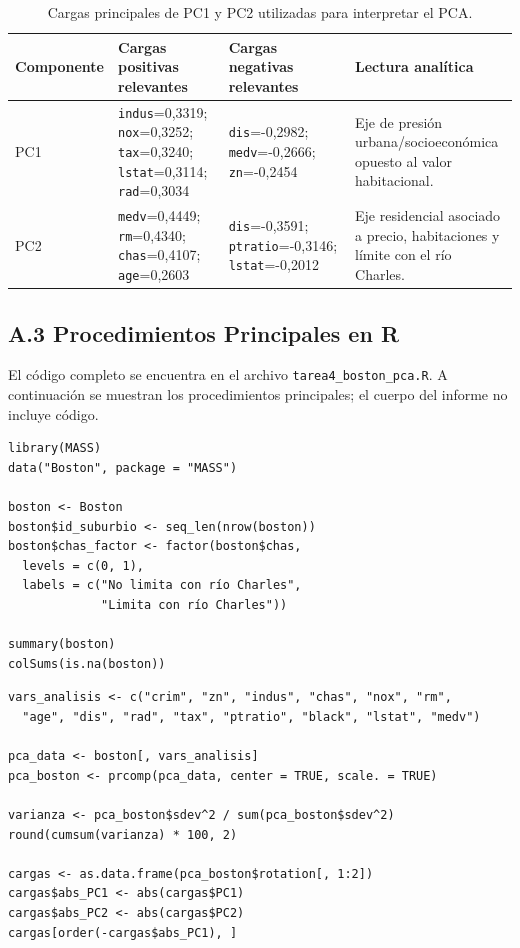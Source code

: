 \documentclass[10pt,a4paper]{article}
\begin{document}
\begin{table}[H]
  \centering
  \caption{Cargas principales de PC1 y PC2 utilizadas para interpretar el PCA.}
  \label{tab:pca_cargas}
  \footnotesize
  \begin{tabularx}{\textwidth}{l X X X}
    \toprule
    \textbf{Componente} & \textbf{Cargas positivas relevantes} & \textbf{Cargas negativas relevantes} & \textbf{Lectura analítica} \\
    \midrule
    PC1 & \texttt{indus}=0,3319; \texttt{nox}=0,3252; \texttt{tax}=0,3240; \texttt{lstat}=0,3114; \texttt{rad}=0,3034 & \texttt{dis}=-0,2982; \texttt{medv}=-0,2666; \texttt{zn}=-0,2454 & Eje de presión urbana/socioeconómica opuesto al valor habitacional. \\
    PC2 & \texttt{medv}=0,4449; \texttt{rm}=0,4340; \texttt{chas}=0,4107; \texttt{age}=0,2603 & \texttt{dis}=-0,3591; \texttt{ptratio}=-0,3146; \texttt{lstat}=-0,2012 & Eje residencial asociado a precio, habitaciones y límite con el río Charles. \\
    \bottomrule
  \end{tabularx}
\end{table}

\subsection*{A.3 Procedimientos Principales en R}

El código completo se encuentra en el archivo \texttt{tarea4\_boston\_pca.R}. A continuación se muestran los procedimientos principales; el cuerpo del informe no incluye código.

\begin{lstlisting}[caption={Carga de datos y revisión inicial.}]
library(MASS)
data("Boston", package = "MASS")

boston <- Boston
boston$id_suburbio <- seq_len(nrow(boston))
boston$chas_factor <- factor(boston$chas,
  levels = c(0, 1),
  labels = c("No limita con río Charles",
             "Limita con río Charles"))

summary(boston)
colSums(is.na(boston))
\end{lstlisting}

\begin{lstlisting}[caption={PCA sobre variables estandarizadas.}]
vars_analisis <- c("crim", "zn", "indus", "chas", "nox", "rm",
  "age", "dis", "rad", "tax", "ptratio", "black", "lstat", "medv")

pca_data <- boston[, vars_analisis]
pca_boston <- prcomp(pca_data, center = TRUE, scale. = TRUE)

varianza <- pca_boston$sdev^2 / sum(pca_boston$sdev^2)
round(cumsum(varianza) * 100, 2)

cargas <- as.data.frame(pca_boston$rotation[, 1:2])
cargas$abs_PC1 <- abs(cargas$PC1)
cargas$abs_PC2 <- abs(cargas$PC2)
cargas[order(-cargas$abs_PC1), ]
\end{lstlisting}
\end{document}
